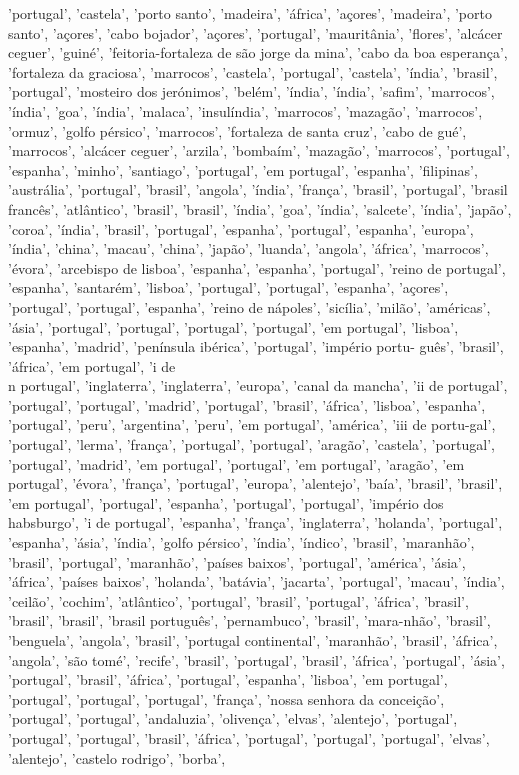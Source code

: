 \documentclass{article}
\begin{document}
\begin{itemize}
'portugal', 'castela', 'porto santo', 'madeira', 'áfrica', 'açores', 'madeira', 'porto santo', 'açores', 'cabo bojador', 'açores', 'portugal', 'mauritânia', 'flores', 'alcácer ceguer', 'guiné', 'feitoria-fortaleza de são jorge da mina', 'cabo da boa esperança', 'fortaleza da graciosa', 'marrocos', 'castela', 'portugal', 'castela', 'índia', 'brasil', 'portugal', 'mosteiro dos jerónimos', 'belém', 'índia', 'índia', 'safim', 'marrocos', 'índia', 'goa', 'índia', 'malaca', 'insulíndia', 'marrocos', 'mazagão', 'marrocos', 'ormuz', 'golfo pérsico', 'marrocos', 'fortaleza de santa cruz', 'cabo de gué', 'marrocos', 'alcácer ceguer', 'arzila', 'bombaím', 'mazagão', 'marrocos', 'portugal', 'espanha', 'minho', 'santiago', 'portugal', 'em portugal', 'espanha', 'filipinas', 'austrália', 'portugal', 'brasil', 'angola', 'índia', 'frança', 'brasil', 'portugal', 'brasil francês', 'atlântico', 'brasil', 'brasil', 'índia', 'goa', 'índia', 'salcete', 'índia', 'japão', 'coroa', 'índia', 'brasil', 'portugal', 'espanha', 'portugal', 'espanha', 'europa', 'índia', 'china', 'macau', 'china', 'japão', 'luanda', 'angola', 'áfrica', 'marrocos', 'évora', 'arcebispo de lisboa', 'espanha', 'espanha', 'portugal', 'reino de portugal', 'espanha', 'santarém', 'lisboa', 'portugal', 'portugal', 'espanha', 'açores', 'portugal', 'portugal', 'espanha', 'reino de nápoles', 'sicília', 'milão', 'américas', 'ásia', 'portugal', 'portugal', 'portugal', 'portugal', 'em portugal', 'lisboa', 'espanha', 'madrid', 'península ibérica', 'portugal', 'império portu- guês', 'brasil', 'áfrica', 'em portugal', 'i de\\n portugal', 'inglaterra', 'inglaterra', 'europa', 'canal da mancha', 'ii de portugal', 'portugal', 'portugal', 'madrid', 'portugal', 'brasil', 'áfrica', 'lisboa', 'espanha', 'portugal', 'peru', 'argentina', 'peru', 'em portugal', 'américa', 'iii de portu-gal', 'portugal', 'lerma', 'frança', 'portugal', 'portugal', 'aragão', 'castela', 'portugal', 'portugal', 'madrid', 'em portugal', 'portugal', 'em portugal', 'aragão', 'em portugal', 'évora', 'frança', 'portugal', 'europa', 'alentejo', 'baía', 'brasil', 'brasil', 'em portugal', 'portugal', 'espanha', 'portugal', 'portugal', 'império dos habsburgo', 'i de portugal', 'espanha', 'frança', 'inglaterra', 'holanda', 'portugal', 'espanha', 'ásia', 'índia', 'golfo pérsico', 'índia', 'índico', 'brasil', 'maranhão', 'brasil', 'portugal', 'maranhão', 'países baixos', 'portugal', 'américa', 'ásia', 'áfrica', 'países baixos', 'holanda', 'batávia', 'jacarta', 'portugal', 'macau', 'índia', 'ceilão', 'cochim', 'atlântico', 'portugal', 'brasil', 'portugal', 'áfrica', 'brasil', 'brasil', 'brasil', 'brasil português', 'pernambuco', 'brasil', 'mara-nhão', 'brasil', 'benguela', 'angola', 'brasil', 'portugal continental', 'maranhão', 'brasil', 'áfrica', 'angola', 'são tomé', 'recife', 'brasil', 'portugal', 'brasil', 'áfrica', 'portugal', 'ásia', 'portugal', 'brasil', 'áfrica', 'portugal', 'espanha', 'lisboa', 'em portugal', 'portugal', 'portugal', 'portugal', 'frança', 'nossa senhora da conceição', 'portugal', 'portugal', 'andaluzia', 'olivença', 'elvas', 'alentejo', 'portugal', 'portugal', 'portugal', 'brasil', 'áfrica', 'portugal', 'portugal', 'portugal', 'elvas', 'alentejo', 'castelo rodrigo', 'borba', 
\end{itemize}
\end{document}
